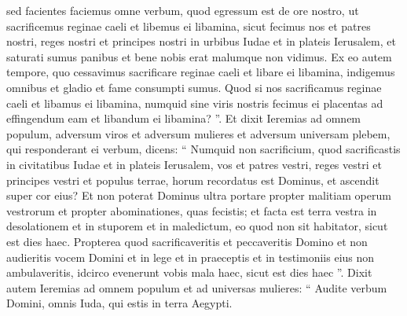 \begin{biblechapter}
\begin{biblechapter}
\begin{biblechapter}
\begin{biblechapter}
\begin{biblechapter}
\begin{biblechapter}
\begin{biblechapter}
\begin{biblechapter}
\begin{biblechapter}
\begin{biblechapter}
\begin{biblechapter}
\begin{biblechapter}
\begin{biblechapter}
\begin{biblechapter}
\begin{biblechapter}
\begin{biblechapter}
\begin{biblechapter}
\begin{biblechapter}
\begin{biblechapter}
\begin{biblechapter}
\begin{biblechapter}
\begin{biblechapter}
\begin{biblechapter}
\begin{biblechapter}
\begin{biblechapter}
\begin{biblechapter}
\begin{biblechapter}
\begin{biblechapter}
\begin{biblechapter}
\begin{biblechapter}
\begin{biblechapter}
\begin{biblechapter}
\begin{biblechapter}
\begin{biblechapter}
\begin{biblechapter}
\begin{biblechapter}
\begin{biblechapter}
\begin{biblechapter}
\begin{biblechapter}
\begin{biblechapter}
\begin{biblechapter}
\begin{biblechapter}
\begin{biblechapter}
\begin{biblechapter}
\verse sed facientes faciemus omne verbum, quod egressum est de ore nostro, ut sacrificemus reginae caeli et libemus ei libamina, sicut fecimus nos et patres nostri, reges nostri et principes nostri in urbibus Iudae et in plateis Ierusalem, et saturati sumus panibus et bene nobis erat malumque non vidimus. 
 \verse Ex eo autem tempore, quo cessavimus sacrificare reginae caeli et libare ei libamina, indigemus omnibus et gladio et fame consumpti sumus. 
\verse Quod si nos sacrificamus reginae caeli et libamus ei libamina, numquid sine viris nostris fecimus ei placentas ad effingendum eam et libandum ei libamina? ”.
 \verse Et dixit Ieremias ad omnem populum, adversum viros et adversum mulieres et adversum universam plebem, qui responderant ei verbum, dicens: 
\verse “ Numquid non sacrificium, quod sacrificastis in civitatibus Iudae et in plateis Ierusalem, vos et patres vestri, reges vestri et principes vestri et populus terrae, horum recordatus est Dominus, et ascendit super cor eius? 
\verse Et non poterat Dominus ultra portare propter malitiam operum vestrorum et propter abominationes, quas fecistis; et facta est terra vestra in desolationem et in stuporem et in maledictum, eo quod non sit habitator, sicut est dies haec. 
 \verse Propterea quod sacrificaveritis et peccaveritis Domino et non audieritis vocem Domini et in lege et in praeceptis et in testimoniis eius non ambulaveritis, idcirco evenerunt vobis mala haec, sicut est dies haec ”.
 \verse Dixit autem Ieremias ad omnem populum et ad universas mulieres: “ Audite verbum Domini, omnis Iuda, qui estis in terra Aegypti. 

\end{biblechapter}
\end{biblechapter}
\end{biblechapter}
\end{biblechapter}
\end{biblechapter}
\end{biblechapter}
\end{biblechapter}
\end{biblechapter}
\end{biblechapter}
\end{biblechapter}
\end{biblechapter}
\end{biblechapter}
\end{biblechapter}
\end{biblechapter}
\end{biblechapter}
\end{biblechapter}
\end{biblechapter}
\end{biblechapter}
\end{biblechapter}
\end{biblechapter}
\end{biblechapter}
\end{biblechapter}
\end{biblechapter}
\end{biblechapter}
\end{biblechapter}
\end{biblechapter}
\end{biblechapter}
\end{biblechapter}
\end{biblechapter}
\end{biblechapter}
\end{biblechapter}
\end{biblechapter}
\end{biblechapter}
\end{biblechapter}
\end{biblechapter}
\end{biblechapter}
\end{biblechapter}
\end{biblechapter}
\end{biblechapter}
\end{biblechapter}
\end{biblechapter}
\end{biblechapter}
\end{biblechapter}
\end{biblechapter}
